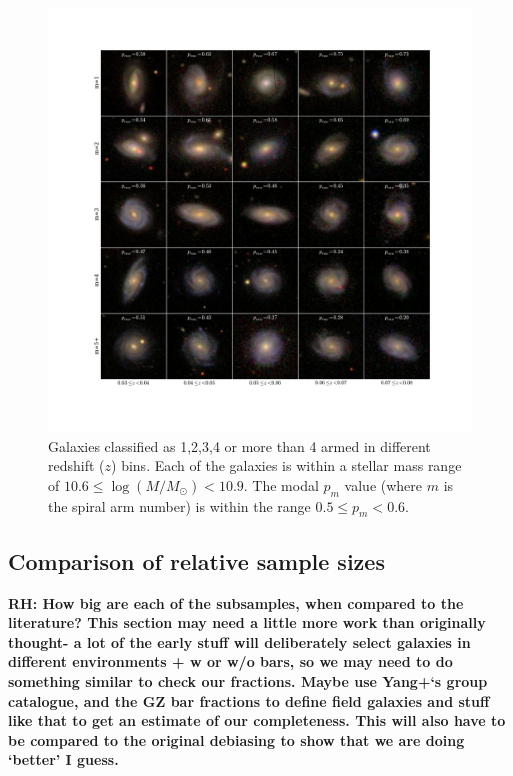 \documentclass[useAMS,usenatbib]{mn2e}
\newcommand{\rh}[1]{{\bf \textcolor{RoyalPurple}{RH: #1}}}
\begin{document}
\begin{figure}
		\centering

        \includegraphics[width=1\textwidth]{Data_imgs/image_panel.pdf}

        \caption{Galaxies classified as 1,2,3,4 or more than 4 armed in different redshift ($z$) bins. Each of the galaxies is within a stellar mass range of $10.6 \leq \log(M/M_{\odot}) < 10.9$. The modal $p_m$ value (where $m$ is the spiral arm number) is within the range $0.5 \leq p_m < 0.6$.}

        \label{fig:image_panel}

\end{figure}

\subsection{Comparison of relative sample sizes}

\rh{How big are each of the subsamples, when compared to the literature? This section may need a little more work than originally thought- a lot of the early stuff will deliberately select galaxies in different environments + w or w/o bars, so we may need to do something similar to check our fractions. Maybe use Yang+`s group catalogue, and the GZ bar fractions to define field galaxies and stuff like that to get an estimate of our completeness. This will also have to be compared to the original debiasing to show that we are doing `better' I guess.}
\end{document}
